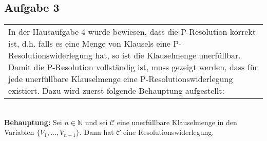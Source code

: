\documentclass[a4paper,10pt]{article}
\newcommand{\tabspace}{15cm}
\begin{document}
\subsection*{Aufgabe 3}
\begin{tabular}{@{} p{\tabspace}}
In der Hausaufgabe 4 wurde bewiesen, dass die P-Resolution korrekt ist, d.h. falls es eine Menge von Klausels eine P-Resolutionswiderlegung hat, so ist die Klauselmenge unerfüllbar. Damit die P-Resolution vollständig ist, muss gezeigt werden, dass für jede unerfüllbare Klauselmenge eine P-Resolutionswiderlegung existiert. Dazu wird zuerst folgende Behauptung aufgestellt: \\
\end{tabular}
\ \\
\textbf{Behauptung: } Sei $n \in \mathbb{N}$ und sei $\mathcal{C}$ eine unerfüllbare Klauselmenge in den Variablen $\{V_1,...,V_{n-1} \}$. Dann hat $\mathcal{C}$ eine Resolutionswiderlegung. 
\end{document}
